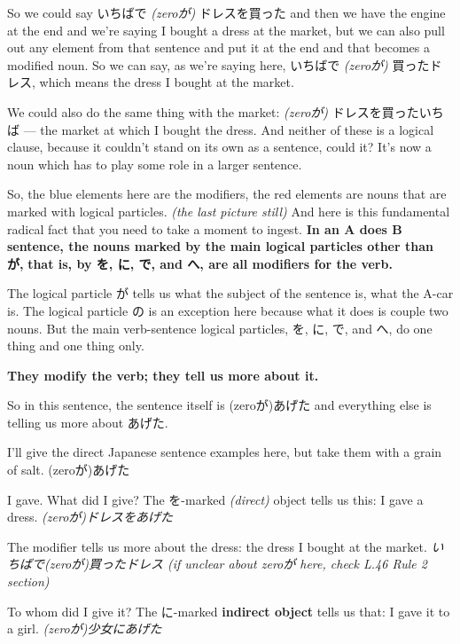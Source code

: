 So we could say いちばで {\em (zeroが)} ドレスを買った and then we have the engine at the end and we're saying I bought a dress at the market, but we can also pull out any element from that sentence and put it at the end and that becomes a modified noun. So we can say, as we're saying here, いちばで {\em (zeroが)} 買ったドレス, which means the dress I bought at the market.

We could also do the same thing with the market: {\em (zeroが)} ドレスを買ったいちば --- the market at which I bought the dress. And neither of these is a logical clause, because it couldn't stand on its own as a sentence, could it? It's now a noun which has to play some role in a larger sentence.

So, the blue elements here are the modifiers, the red elements are nouns that are marked with logical particles. {\em (the last picture still)} And here is this fundamental radical fact that you need to take a moment to ingest. {\bf In an A does B sentence, the nouns marked by the main logical particles other than が,} {\bf that is, by を, に, で, and へ, are all modifiers for the verb.}

The logical particle が tells us what the subject of the sentence is, what the A-car is. The logical particle の is an exception here because what it does is couple two nouns. But the main verb-sentence logical particles, を, に, で, and へ, do one thing and one thing only.

{\bf They modify the verb; they tell us more about it.}

{}

So in this sentence, the sentence itself is (zeroが)あげた and everything else is telling us more about あげた.

\startitemize[packed]
\item
  I'll give the direct Japanese sentence examples here, but take them with a grain of salt. (zeroが)あげた
\stopitemize

I gave. What did I give? The を-marked {\em (direct)} object tells us this: I gave a dress. {\em (zeroが)ドレスをあげた}

The modifier tells us more about the dress: the dress I bought at the market. {\em いちばで(zeroが)買ったドレス (if unclear about zeroが here, check L.46 Rule 2 section)}

To whom did I give it? The に-marked {\bf indirect object} tells us that: I gave it to a girl. {\em (zeroが)少女にあげた}

